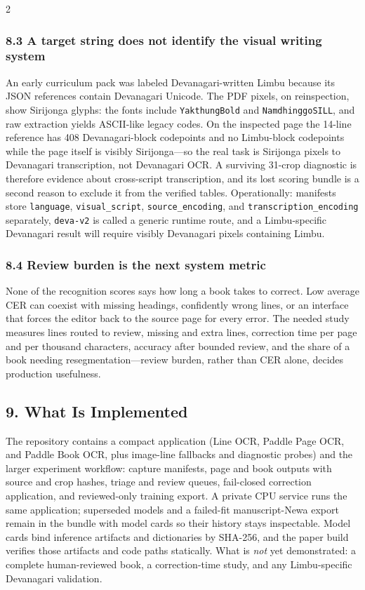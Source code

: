 \documentclass[
  10pt,
]{article}
\begin{document}
\begin{multicols}{2}
\subsubsection{8.3 A target string does not identify the visual writing
system}\label{a-target-string-does-not-identify-the-visual-writing-system}

An early curriculum pack was labeled Devanagari-written Limbu because
its JSON references contain Devanagari Unicode. The PDF pixels, on
reinspection, show Sirijonga glyphs: the fonts include
\texttt{YakthungBold} and \texttt{NamdhinggoSILL}, and raw extraction
yields ASCII-like legacy codes. On the inspected page the 14-line
reference has 408 Devanagari-block codepoints and no Limbu-block
codepoints while the page itself is visibly Sirijonga---so the real task
is Sirijonga pixels to Devanagari transcription, not Devanagari OCR. A
surviving 31-crop diagnostic is therefore evidence about cross-script
transcription, and its lost scoring bundle is a second reason to exclude
it from the verified tables. Operationally: manifests store
\texttt{language}, \texttt{visual\_script}, \texttt{source\_encoding},
and \texttt{transcription\_encoding} separately, \texttt{deva-v2} is
called a generic runtime route, and a Limbu-specific Devanagari result
will require visibly Devanagari pixels containing Limbu.

\subsubsection{8.4 Review burden is the next system
metric}\label{review-burden-is-the-next-system-metric}

None of the recognition scores says how long a book takes to correct.
Low average CER can coexist with missing headings, confidently wrong
lines, or an interface that forces the editor back to the source page
for every error. The needed study measures lines routed to review,
missing and extra lines, correction time per page and per thousand
characters, accuracy after bounded review, and the share of a book
needing resegmentation---review burden, rather than CER alone, decides
production usefulness.

\subsection{9. What Is Implemented}\label{what-is-implemented}

The repository contains a compact application (Line OCR, Paddle Page
OCR, and Paddle Book OCR, plus image-line fallbacks and diagnostic
probes) and the larger experiment workflow: capture manifests, page and
book outputs with source and crop hashes, triage and review queues,
fail-closed correction application, and reviewed-only training export. A
private CPU service runs the same application; superseded models and a
failed-fit manuscript-Newa export remain in the bundle with model cards
so their history stays inspectable. Model cards bind inference artifacts
and dictionaries by SHA-256, and the paper build verifies those
artifacts and code paths statically. What is \emph{not} yet
demonstrated: a complete human-reviewed book, a correction-time study,
and any Limbu-specific Devanagari validation.


\end{multicols}
\end{document}
